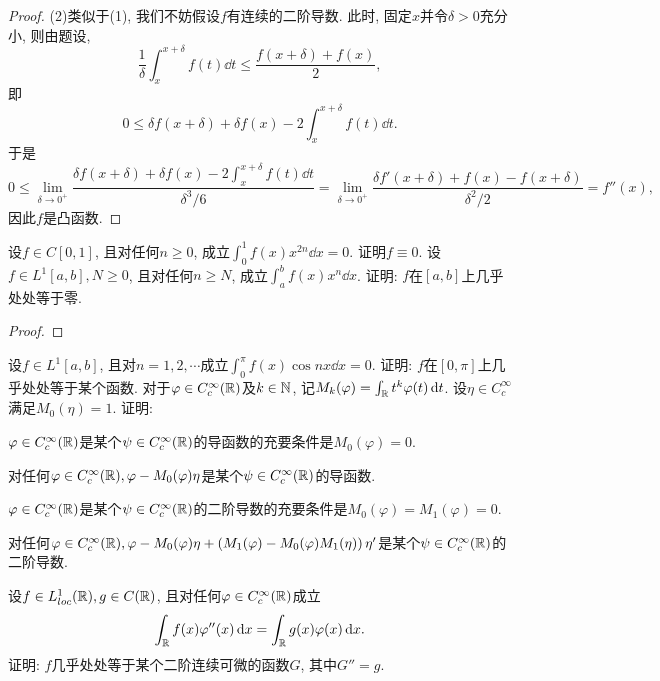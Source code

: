 \begin{quiza}
\begin{proof}
(2)类似于(1), 我们不妨假设\(f\)有连续的二阶导数. 此时, 固定\(x\)并令\(\delta>0\)充分小, 则由题设,\[\frac{1}{\delta}\int_{x}^{x+\delta}f(t)\dd t\leqslant\frac{f(x+\delta)+f(x)}{2},\]即\[0\leqslant\delta f(x+\delta)+\delta f(x)-2\int_{x}^{x+\delta}f(t)\dd t.\]于是\[0\leqslant\lim_{\delta\rightarrow 0^+}\frac{\delta f(x+\delta)+\delta f(x)-2\int_{x}^{x+\delta}f(t)\dd t}{\delta^3/6}=\lim_{\delta\rightarrow 0^+}\frac{\delta f'(x+\delta)+f(x)-f(x+\delta)}{\delta^2/2}=f''(x),\]因此\(f\)是凸函数.
\end{proof}
\woe 设\(f\in C[0,1]\), 且对任何\(n\geqslant 0\), 成立\(\int_{0}^{1}f(x)x^{2n}\dd x=0\). 证明\(f\equiv 0\).
\woe 设\(f\in L^1[a,b],N\geqslant 0\), 且对任何\(n\geqslant N\), 成立\(\int_{a}^{b}f(x)x^n\dd x\). 证明: \(f\)在\([a,b]\)上几乎处处等于零. 
\begin{proof}

\end{proof}
\woe 设\(f\in L^1[a,b]\), 且对\(n=1,2,\cdots\)成立\(\int_{0}^{\pi}f(x)\cos nx\dd x=0\). 证明: \(f\)在\([0,\pi]\)上几乎处处等于某个函数.
\woe 对于\(\varphi\in C_c^{\infty}(\mathbb{R})\)及\(k\in\mathbb{N}\), 记\(M_k(\varphi)=\int_{\mathbb{R}}t^k\varphi(t)\,\mathrm{d} t\). 设\(\eta\in C_c^{\infty}\)满足\(M_0(\eta)=1\). 证明:\begin{quizs}
\item \(\varphi\in C_c^{\infty}(\mathbb{R})\)是某个\(\psi\in C_c^{\infty}(\mathbb{R})\)的导函数的充要条件是\(M_0(\varphi)=0\).
\item 对任何\(\varphi\in C_c^{\infty}(\mathbb{R}), \varphi-M_0(\varphi)\eta\)是某个\(\psi\in C_c^{\infty}(\mathbb{R})\)的导函数.
\item \(\varphi\in C_c^{\infty}(\mathbb{R})\)是某个\(\psi\in C_c^{\infty}(\mathbb{R})\)的二阶导数的充要条件是\(M_0(\varphi)=M_1(\varphi)=0\).
\item 对任何\(\varphi\in C_c^{\infty}(\mathbb{R}),\varphi-M_0(\varphi)\eta+\left(M_1(\varphi)-M_0(\varphi)M_1(\eta)\right)\eta'\)是某个\(\psi\in C_c^{\infty}(\mathbb{R})\)的二阶导数.
\end{quizs}
\woe 设\(f\in L_{loc}^1(\mathbb{R}),g\in C(\mathbb{R})\), 且对任何\(\varphi\in C_c^{\infty}(\mathbb{R})\)成立\[\int_{\mathbb{R}}f(x)\varphi''(x)\,\mathrm{d} x=\int_{\mathbb{R}}g(x)\varphi(x)\,\mathrm{d} x.\]证明: \(f\)几乎处处等于某个二阶连续可微的函数\(G\), 其中\(G''=g\).
\end{quiza}
